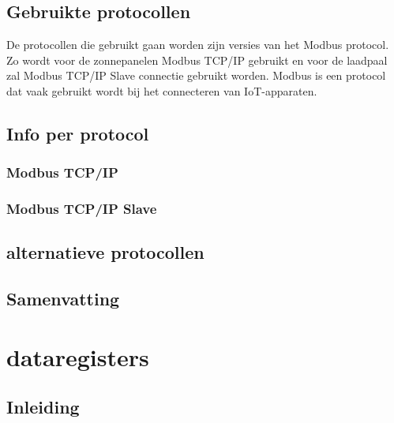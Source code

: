 \subsection{Gebruikte protocollen}
\label{sec:stand-van-zaken-protocollen-gebruikte-protocollen}

De protocollen die gebruikt gaan worden zijn versies van het Modbus protocol. Zo wordt voor de zonnepanelen Modbus TCP/IP gebruikt en voor de laadpaal zal Modbus TCP/IP Slave connectie gebruikt worden. Modbus is een protocol dat vaak gebruikt wordt bij het connecteren van IoT-apparaten.

\subsection{Info per protocol}
\label{sec:stand-van-zaken-protocollen-info-per-protocol}

\subsubsection{Modbus TCP/IP}
\label{sec:stand-van-zaken-protocollen-modbus-tcp-ip}



\subsubsection{Modbus TCP/IP Slave}
\label{sec:stand-van-zaken-protocollen-modbus-tcp-ip-slave}



\subsection{alternatieve protocollen}
\label{sec:stand-van-zaken-protocollen-alternatieve-protocollen}



\subsection{Samenvatting}
\label{sec:stand-van-zaken-protocollen-samenvatting}



\section{dataregisters}
\label{sec:stand-van-zaken-dataregisters}

\subsection{Inleiding}
\label{sec:stand-van-zaken-dataregisters-inleiding}

